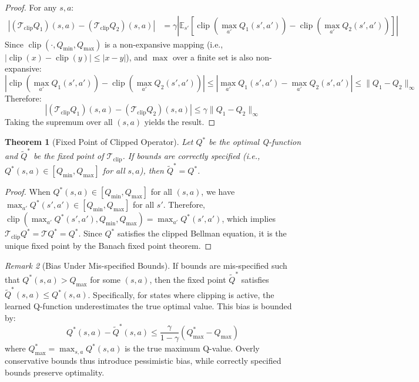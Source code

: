 \documentclass[11pt]{article}
\newtheorem{theorem}{Theorem}
\theoremstyle{definition}
\theoremstyle{remark}
\newtheorem{remark}[theorem]{Remark}
\newcommand{\E}{\mathbb{E}}
\DeclareMathOperator{\clip}{clip}
\begin{document}
\begin{proof}
For any $s, a$:
\begin{align*}
|(\mathcal{T}_{\text{clip}} Q_1)(s,a) - (\mathcal{T}_{\text{clip}} Q_2)(s,a)| &= \gamma \left|\E_{s'}\left[\clip(\max_{a'} Q_1(s',a')) - \clip(\max_{a'} Q_2(s',a'))\right]\right|
\end{align*}
Since $\clip(\cdot, Q_{\min}, Q_{\max})$ is a non-expansive mapping (i.e., $|\clip(x) - \clip(y)| \leq |x - y|$), and $\max$ over a finite set is also non-expansive:
$$|\clip(\max_{a'} Q_1(s',a')) - \clip(\max_{a'} Q_2(s',a'))| \leq |\max_{a'} Q_1(s',a') - \max_{a'} Q_2(s',a')| \leq \|Q_1 - Q_2\|_\infty$$
Therefore:
$$|(\mathcal{T}_{\text{clip}} Q_1)(s,a) - (\mathcal{T}_{\text{clip}} Q_2)(s,a)| \leq \gamma \|Q_1 - Q_2\|_\infty$$
Taking the supremum over all $(s,a)$ yields the result.
\end{proof}

\begin{theorem}[Fixed Point of Clipped Operator]
\label{thm:clipped-fixed-point}
Let $Q^*$ be the optimal Q-function and $\tilde{Q}^*$ be the fixed point of $\mathcal{T}_{\text{clip}}$. If bounds are correctly specified (i.e., $Q^*(s,a) \in [Q_{\min}, Q_{\max}]$ for all $s,a$), then $\tilde{Q}^* = Q^*$.
\end{theorem}

\begin{proof}
When $Q^*(s,a) \in [Q_{\min}, Q_{\max}]$ for all $(s,a)$, we have $\max_{a'} Q^*(s',a') \in [Q_{\min}, Q_{\max}]$ for all $s'$. Therefore, $\clip(\max_{a'} Q^*(s',a'), Q_{\min}, Q_{\max}) = \max_{a'} Q^*(s',a')$, which implies $\mathcal{T}_{\text{clip}} Q^* = \mathcal{T} Q^* = Q^*$. Since $Q^*$ satisfies the clipped Bellman equation, it is the unique fixed point by the Banach fixed point theorem.
\end{proof}

\begin{remark}[Bias Under Mis-specified Bounds]
If bounds are mis-specified such that $Q^*(s,a) > Q_{\max}$ for some $(s,a)$, then the fixed point $\tilde{Q}^*$ satisfies $\tilde{Q}^*(s,a) \leq Q^*(s,a)$. Specifically, for states where clipping is active, the learned Q-function underestimates the true optimal value. This bias is bounded by:
$$Q^*(s,a) - \tilde{Q}^*(s,a) \leq \frac{\gamma}{1-\gamma}(Q^*_{\max} - Q_{\max})$$
where $Q^*_{\max} = \max_{s,a} Q^*(s,a)$ is the true maximum Q-value. Overly conservative bounds thus introduce pessimistic bias, while correctly specified bounds preserve optimality.
\end{remark}
\end{document}
